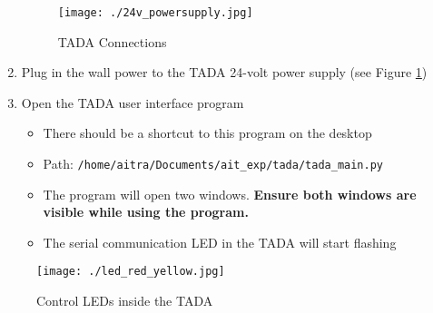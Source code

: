 \begin{enumerate}
  \begin{figure}
  \hypertarget{fig:tada_connect}{%
  \centering
  \texttt{[image: ./24v\_powersupply.jpg]}
  \caption{TADA Connections}\label{fig:tada_connect}
  }
  \end{figure}
\item
  Plug in the wall power to the TADA 24-volt power supply (see Figure
  \ref{fig:tada_connect})
\item
  Open the TADA user interface program

  \begin{itemize}
  \tightlist
  \item
    There should be a shortcut to this program on the desktop
  \item
    Path: \texttt{/home/aitra/Documents/ait\_exp/tada/tada\_main.py}
  \item
    The program will open two windows. \textbf{Ensure both windows are
    visible while using the program.}
  \item
    The serial communication LED in the TADA will start flashing
  \end{itemize}
\end{enumerate}

\begin{figure}
\hypertarget{fig:tada_leds}{%
\centering
\texttt{[image: ./led\_red\_yellow.jpg]}
\caption{Control LEDs inside the TADA}\label{fig:tada_leds}
}
\end{figure}

